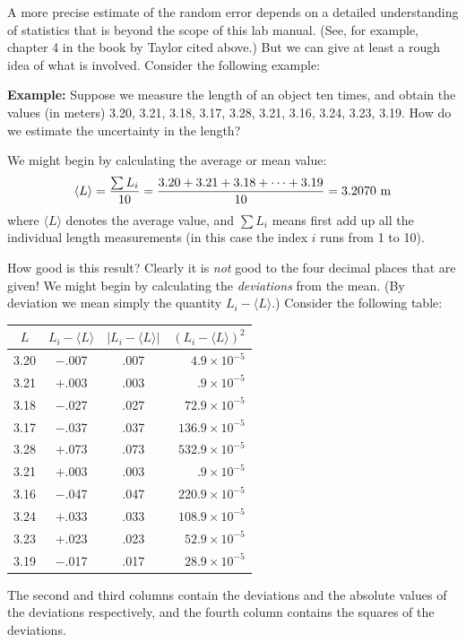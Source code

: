      A more precise estimate of the random error depends on a
detailed understanding of statistics that is beyond the scope of
this lab manual.  (See, for example, chapter 4 in the book by
Taylor cited above.)  But we can give at least a rough idea of
what is involved.  Consider the following example:

{\bf Example:} Suppose we measure the length of an object ten times,
and obtain the values (in meters) 3.20, 3.21, 3.18, 3.17, 3.28, 3.21,
3.16, 3.24, 3.23, 3.19.  How do we estimate the uncertainty in the
length?

  We might begin by calculating the average or mean value:
\[
\langle L \rangle = {{\sum L_{i}} \over {10}} =
{{3.20 + 3.21 + 3.18 + \cdots + 3.19} \over {10}}
 = 3.2070 \mbox{ m}
\]
where $\langle L \rangle$ denotes the average value, and  $\sum L_{i}$
means first add up all the individual length
measurements (in this case the index $i$ runs from 1 to 10).

     How good is this result?  Clearly it is {\em not} good to the
four decimal places that are given!  We might begin by calculating the
{\em deviations} from the mean.  (By deviation we mean simply the
quantity $L_{i} - \langle L \rangle$.)  Consider the following table:
\begin{center}
\begin{tabular}{cccr}
 $L$ & $L_{i} - \langle L \rangle$ & $|L_{i} - \langle L \rangle|$
    & $(L_{i} - \langle L \rangle)^{2}$ \\ \hline
3.20 &  $-$.007 &       .007 &        $4.9 \times 10^{-5}$ \\
3.21 &  $+$.003 &       .003 &         $.9 \times 10^{-5}$ \\
3.18 &  $-$.027 &       .027 &       $72.9 \times 10^{-5}$ \\
3.17 &  $-$.037 &       .037 &      $136.9 \times 10^{-5}$ \\
3.28 &  $+$.073 &       .073 &      $532.9 \times 10^{-5}$ \\
3.21 &  $+$.003 &       .003 &         $.9 \times 10^{-5}$ \\
3.16 &  $-$.047 &       .047 &      $220.9 \times 10^{-5}$ \\
3.24 &  $+$.033 &       .033 &      $108.9 \times 10^{-5}$ \\
3.23 &  $+$.023 &       .023 &       $52.9 \times 10^{-5}$ \\
3.19 &  $-$.017 &       .017 &       $28.9 \times 10^{-5}$ \\
\end{tabular}
\end{center}
The second and third columns contain the deviations and the
absolute values of the deviations respectively, and the fourth
column contains the squares of the deviations.

